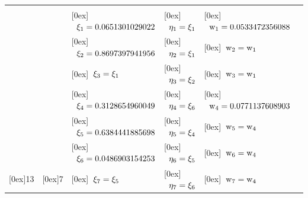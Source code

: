\begin{table}[ht]
\begin{tabular}{|c|c|l|l|l|l|}
\hline

                                                               &                                         &                                                             &                                                               &                                                              \\
                                                               &                                         & \raisebox{0.2cm}[0ex]{$\;\;\rm \xi_1 = 0.06513 01029 022   $} & \raisebox{0.2cm}[0ex]{$\;\;\rm  \eta_1 = \xi_1       $}            & \raisebox{0.2cm}[0ex]{$\;\;\rm w_1 = 0.05334 72356 088 $}    \\
                                                               &                                         & \raisebox{0.2cm}[0ex]{$\;\;\rm \xi_2 = 0.86973 97941 956   $} & \raisebox{0.2cm}[0ex]{$\;\;\rm  \eta_2 = \xi_1       $}            & \raisebox{0.2cm}[0ex]{$\;\;\rm w_2 = w_1 $}                  \\
                                                               &                                         & \raisebox{0.2cm}[0ex]{$\;\;\rm \xi_3 = \xi_1                 $} & \raisebox{0.2cm}[0ex]{$\;\;\rm  \eta_3 = \xi_2       $}            & \raisebox{0.2cm}[0ex]{$\;\;\rm w_3 = w_1 $}                  \\
                                                               &                                         & \raisebox{0.2cm}[0ex]{$\;\;\rm \xi_4 = 0.31286 54960 049   $} & \raisebox{0.2cm}[0ex]{$\;\;\rm  \eta_4 = \xi_6       $}            & \raisebox{0.2cm}[0ex]{$\;\;\rm w_4 = 0.07711 37608 903 $}    \\
                                                               &                                         & \raisebox{0.2cm}[0ex]{$\;\;\rm \xi_5 = 0.63844 41885 698   $} & \raisebox{0.2cm}[0ex]{$\;\;\rm  \eta_5 = \xi_4       $}            & \raisebox{0.2cm}[0ex]{$\;\;\rm w_5 = w_4 $}                  \\
                                                               &                                         & \raisebox{0.2cm}[0ex]{$\;\;\rm \xi_6 = 0.04869 03154 253   $} & \raisebox{0.2cm}[0ex]{$\;\;\rm  \eta_6 = \xi_5       $}            & \raisebox{0.2cm}[0ex]{$\;\;\rm w_6 = w_4 $}                  \\
\raisebox{0.2cm}[0ex]{13}                                      & \raisebox{0.2cm}[0ex]{7}                & \raisebox{0.2cm}[0ex]{$\;\;\rm \xi_7 = \xi_5                 $} & \raisebox{0.2cm}[0ex]{$\;\;\rm  \eta_7 = \xi_6       $}            & \raisebox{0.2cm}[0ex]{$\;\;\rm w_7 = w_4 $}                  \\

\end{tabular}
\end{table}
